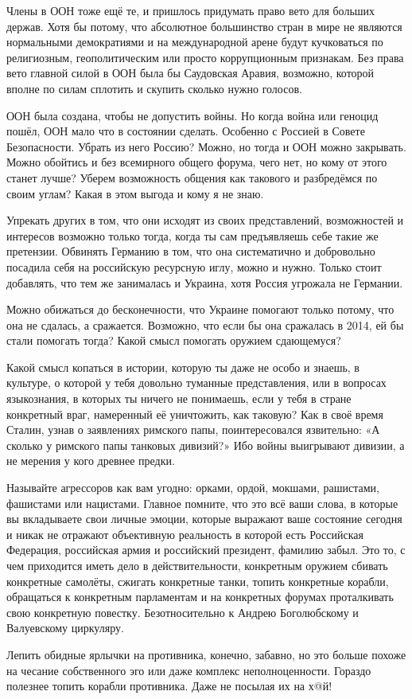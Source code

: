 Члены в ООН тоже ещё те, и пришлось придумать право вето для больших держав.
Хотя бы потому, что абсолютное большинство стран в мире не являются нормальными
демократиями и на международной арене будут кучковаться по религиозным,
геополитическим или просто коррупционным признакам. Без права вето главной
силой в ООН была бы Саудовская Аравия, возможно, которой вполне по силам
сплотить и скупить сколько нужно голосов.

ООН была создана, чтобы не допустить войны. Но когда война или геноцид пошёл,
ООН мало что в состоянии сделать. Особенно с Россией в Совете Безопасности.
Убрать из него Россию? Можно, но тогда и ООН можно закрывать. Можно обойтись и
без всемирного общего форума, чего нет, но кому от этого станет лучше? Уберем
возможность общения как такового и разбредёмся по своим углам? Какая в этом
выгода и кому я не знаю.

Упрекать других в том, что они исходят из своих представлений, возможностей и
интересов возможно только тогда, когда ты сам предъявляешь себе такие же
претензии. Обвинять Германию в том, что она систематично и добровольно посадила
себя на российскую ресурсную иглу, можно и нужно. Только стоит добавлять, что
тем же занималась и Украина, хотя Россия угрожала не Германии.

Можно обижаться до бесконечности, что Украине помогают только потому, что она
не сдалась, а сражается. Возможно, что если бы она сражалась в 2014, ей бы
стали помогать тогда? Какой смысл помогать оружием сдающемуся?

Какой смысл копаться в истории, которую ты даже не особо и знаешь, в культуре,
о которой у тебя довольно туманные представления, или в вопросах языкознания, в
которых ты ничего не понимаешь, если у тебя в стране конкретный враг,
намеренный её уничтожить, как таковую? Как в своё время Сталин, узнав о
заявлениях римского папы, поинтересовался язвительно: «А сколько у римского
папы танковых дивизий?» Ибо войны выигрывают дивизии, а не мерения у кого
древнее предки.

Называйте агрессоров как вам угодно: орками, ордой, мокшами, рашистами,
фашистами или нацистами. Главное помните, что это всё ваши слова, в которые вы
вкладываете свои личные эмоции, которые выражают ваше состояние сегодня и никак
не отражают объективную реальность в которой есть Российская Федерация,
российская армия и российский президент, фамилию забыл. Это то, с чем
приходится иметь дело в действительности, конкретным оружием сбивать конкретные
самолёты, сжигать конкретные танки, топить конкретные корабли, обращаться к
конкретным парламентам и на конкретных форумах проталкивать свою конкретную
повестку. Безотносительно к Андрею Боголюбскому и Валуевскому циркуляру.

Лепить обидные ярлычки на противника, конечно, забавно, но это больше похоже на
чесание собственного эго или даже комплекс неполноценности. Гораздо полезнее
топить корабли противника. Даже не посылая их на х@й!
